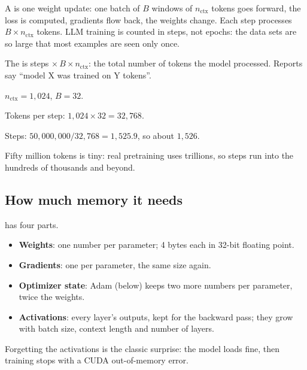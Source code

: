 \begin{definition}
A  is one weight update: one batch of $B$ windows of $n_{\text{ctx}}$ tokens goes forward, the loss is computed, gradients flow back, the weights change. Each step processes $B \times n_{\text{ctx}}$ tokens. LLM training is counted in steps, not epochs: the data sets are so large that most examples are seen only once.
\end{definition}

\begin{definition}
The  is steps $\times\, B \times n_{\text{ctx}}$: the total number of tokens the model processed. Reports say ``model X was trained on Y tokens''.
\end{definition}

\begin{example}
$n_{\text{ctx}} = 1{,}024$, $B = 32$.
\begin{steps}
  \item Tokens per step: $1{,}024 \times 32 = 32{,}768$.
  \item Steps: $50{,}000{,}000 / 32{,}768 = 1{,}525.9$, so about $1{,}526$.
\end{steps}
Fifty million tokens is tiny: real pretraining uses trillions, so steps run into the hundreds of thousands and beyond.
\end{example}

\subsection*{How much memory it needs}

\begin{definition}
 has four parts.
\begin{itemize}
  \item \textbf{Weights}: one number per parameter; 4 bytes each in 32-bit floating point.
  \item \textbf{Gradients}: one per parameter, the same size again.
  \item \textbf{Optimizer state}: Adam (below) keeps two more numbers per parameter, twice the weights.
  \item \textbf{Activations}: every layer's outputs, kept for the backward pass; they grow with batch size, context length and number of layers.
\end{itemize}
Forgetting the activations is the classic surprise: the model loads fine, then training stops with a CUDA out-of-memory error.
\end{definition}

